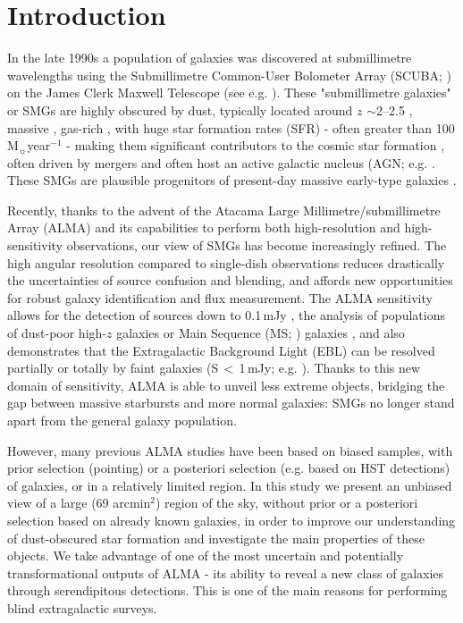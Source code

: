 \documentclass[longauth]{aa}
\begin{document}
\section{Introduction}
In the late 1990s a population of galaxies was discovered at submillimetre wavelengths using the Submillimetre Common-User Bolometer Array (SCUBA; \citealt{Holland1999}) on the James Clerk Maxwell Telescope (see e.g. \citealt{Smail1997,Hughes1998,Barger1998,Blain2002}). These "submillimetre galaxies" or SMGs are highly obscured by dust, typically located around $z$ $\sim$2--2.5 \citep[e.g.][]{Chapman2003,Wardlow2011,Yun2012}, massive \citep[M$_\star$\,$>$\,7\,$\times$\,10$^{10} $M$_\sun$ ; e.g.][]{Chapman2005,Hainline2011,Simpson2014}, gas-rich \citep[f$_{gas}$\,$>$\,50\%; e.g.][]{Daddi2010}, with huge star formation rates (SFR) - often greater than 100 M$_\sun$year$^{-1}$ \citep[e.g.][]{Magnelli2012, Swinbank2014} - making them significant contributors to the cosmic star formation \citep[e.g.][]{Casey2013}, often driven by mergers \citep[e.g.][]{Tacconi2008, Narayanan2010} and often host an active galactic nucleus (AGN; e.g. \citealt{Alexander2008, Pope2008,Wang2013}. These SMGs are plausible progenitors of present-day massive early-type galaxies \citep[e.g.][]{Cimatti2008, Michaowski2010}. 

Recently, thanks to the advent of the Atacama Large Millimetre/submillimetre Array (ALMA) and its capabilities to perform both high-resolution and high-sensitivity observations, our view of SMGs has become increasingly refined. The high angular resolution compared to single-dish observations reduces drastically the uncertainties of source confusion and blending, and affords new opportunities for robust galaxy identification and flux measurement. The ALMA sensitivity allows for the detection of sources down to 0.1\,mJy \citep[e.g.][]{Carniani2015}, the analysis of populations of dust-poor high-$z$ galaxies \citep{Fujimoto2016} or Main Sequence (MS; \citealt{Noeske2007,Rodighiero2011, Elbaz2011}) galaxies \cite[e.g.][]{Papovich2016,Dunlop2017,Schreiber2017b}, and also demonstrates that the Extragalactic Background Light (EBL) can be resolved partially or totally by faint galaxies (S\,$<$\,1\,mJy; e.g. \citealt{Hatsukade2013, Ono2014, Carniani2015, Fujimoto2016}). Thanks to this new domain of sensitivity, ALMA is able to unveil less extreme objects, bridging the gap between massive starbursts and more normal galaxies: SMGs no longer stand apart from the general galaxy population.

However, many previous ALMA studies have been based on biased samples, with prior selection (pointing) or a posteriori selection (e.g. based on HST detections) of galaxies, or in a relatively limited region. In this study we present an unbiased view of a large (69 arcmin$^2$) region of the sky, without prior or a posteriori selection based on already known galaxies, in order to improve our understanding of dust-obscured star formation and investigate the main properties of these objects. We take advantage of one of the most uncertain and potentially transformational outputs of ALMA - its ability to reveal a new class of galaxies through serendipitous detections. This is one of the main reasons for performing blind extragalactic surveys.
\end{document}
